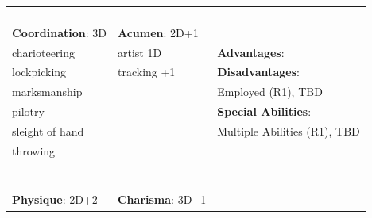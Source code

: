 \documentclass[10pt]{article}
\begin{document}
\begin{table}
\begin{tabular}{m{156pt} m{156pt} m{156pt}}
 \hrulefill &  \hrulefill & \\

 \hrulefill &  \hrulefill & \\

 \hrulefill &  \hrulefill & \\

 \hrulefill &  \hrulefill & \\


\textbf{Coordination}: 3D \hrulefill & \textbf{Acumen}: 2D+1 \hrulefill     & \hrulefill \\

charioteering        \hrulefill & artist            1D \hrulefill & \textbf{Advantages}: \hrulefill \\

lockpicking          \hrulefill & tracking          +1 \hrulefill & \textbf{Disadvantages}: \hrulefill \\

marksmanship         \hrulefill &  \hrulefill & Employed (R1), TBD \hrulefill \\

pilotry              \hrulefill &  \hrulefill & \textbf{Special Abilities}: \hrulefill \\

sleight of hand      \hrulefill &  \hrulefill & Multiple Abilities (R1), TBD \hrulefill \\

throwing             \hrulefill &  \hrulefill &  \hrulefill \\

 \hrulefill &  \hrulefill &  \hrulefill \\

 \hrulefill &  \hrulefill &  \hrulefill \\

 \hrulefill &  \hrulefill &  \hrulefill \\

 \hrulefill &  \hrulefill &  \hrulefill \\

 \hrulefill &  \hrulefill &  \hrulefill \\

 \hrulefill &  \hrulefill &  \hrulefill \\

 \hrulefill &  \hrulefill &  \hrulefill \\


\textbf{Physique}: 2D+2 \hrulefill & \textbf{Charisma}: 3D+1 \hrulefill     &  \hrulefill \\


\end{tabular}
\end{table}
\end{document}
